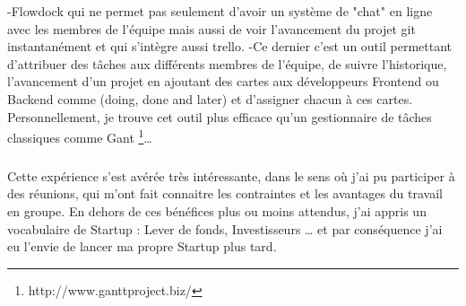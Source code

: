 -Flowdock qui ne permet pas seulement d'avoir un système de "chat" en ligne avec les membres de l'équipe mais aussi de voir l'avancement du projet git instantanément et qui s'intègre aussi trello.
\newline
-Ce dernier c'est un outil permettant d'attribuer des tâches aux différents membres de l'équipe, de suivre l'historique, l'avancement d'un projet en ajoutant des cartes aux développeurs Frontend ou Backend comme (doing, done and later) et d'assigner chacun à ces cartes.
Personnellement, je trouve cet outil plus efficace qu'un gestionnaire de tâches classiques comme Gant \footnote{http://www.ganttproject.biz/}…
\subparagraph{}
Cette expérience s’est avérée très intéressante, dans le sens où j’ai pu participer à des réunions, qui m’ont fait connaitre les contraintes et les avantages du travail en groupe.
En dehors de ces bénéfices plus ou moins attendus, j'ai appris un vocabulaire de Startup : Lever de fonds, Investisseurs … et par conséquence j'ai eu l'envie de lancer ma propre Startup plus tard.

